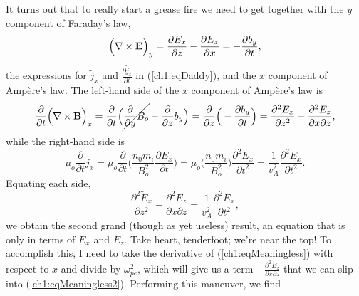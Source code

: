 It turns out that to really start a grease fire we need to get together with the
$y$ component of Faraday's law,
\begin{equation*}
  \Big ( {\bf \nabla} \times \mathbf{E} \Big )_y = \dfrac{\partial E_x}{\partial z} - \dfrac{\partial E_z}{\partial x} = - \dfrac{\partial b_y}{\partial t},
\end{equation*}
the expressions for $\tilde j_x$ and $\frac{\partial \tilde j_z}{\partial t}$ in
(\ref{ch1:eqDaddy}), and the $x$ component of Amp\`{e}re's law. The left-hand
side of the $x$ component of Amp\`{e}re's law is
\begin{equation*}
  \dfrac{\partial}{\partial t} \Big ( {\bf \nabla} \times \mathbf{B} \Big )_x = \dfrac{\partial}{\partial t} \Big ( \cancel{\dfrac{\partial}{\partial y} B_o} - \dfrac{\partial}{\partial z} b_y \Big ) = \dfrac{\partial}{\partial z} \Big ( - \dfrac{\partial b_y}{\partial t} \Big ) = \dfrac{\partial^2 E_x}{\partial z^2} - \dfrac{\partial^2 E_z}{\partial x \partial z},
\end{equation*}
while the right-hand side is 
\begin{equation*}
  \mu_o \dfrac{\partial}{\partial t} \tilde j_x = \mu_o \dfrac{\partial}{\partial t} \Big ( \dfrac{n_0 m_i}{B_o^2} \dfrac{\partial E_x}{\partial t} \Big ) = \mu_o \Big ( \dfrac{n_0 m_i}{B_o^2} \Big ) \dfrac{\partial^2 E_x}{\partial t^2} = \dfrac{1}{v_A^2} \dfrac{\partial^2 E_x}{\partial t^2}.
\end{equation*}
Equating each side, 
\begin{equation} \label{ch1:eqMeaningless2} \dfrac{\partial^2 \tilde
    E_x}{\partial z^2} - \dfrac{\partial^2 E_z}{\partial x \partial z} =
  \dfrac{1}{v_A^2} \dfrac{\partial^2 E_x}{\partial t^2},
\end{equation}
we obtain the second grand (though as yet useless) result, an equation that is
only in terms of $E_x$ and $E_z$. Take heart, tenderfoot; we're near the top!
To accomplish this, I need
to %
take the derivative of (\ref{ch1:eqMeaningless}) with respect to $x$ and divide
by $\omega_{pe}^2$, which will give us a term
$-\frac{\partial^2 E_z}{\partial x \partial z}$ that we can slip into
(\ref{ch1:eqMeaningless2}). Performing this maneuver, we find
